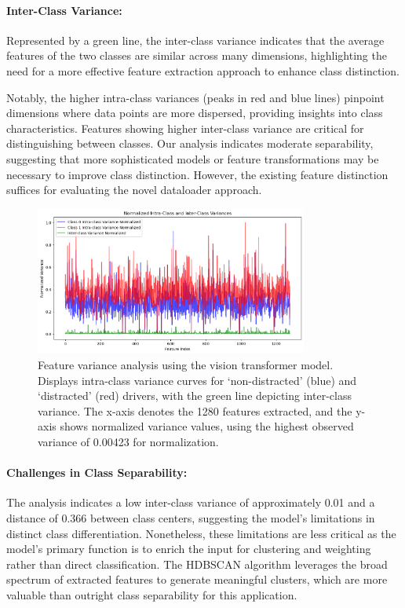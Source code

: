 \paragraph{Inter-Class Variance:} Represented by a green line, the inter-class variance indicates that the average features of the two classes are similar across many dimensions, highlighting the need for a more effective feature extraction approach to enhance class distinction.

Notably, the higher intra-class variances (peaks in red and blue lines) pinpoint dimensions where data points are more dispersed, providing insights into class characteristics. Features showing higher inter-class variance are critical for distinguishing between classes. Our analysis indicates moderate separability, suggesting that more sophisticated models or feature transformations may be necessary to improve class distinction. However, the existing feature distinction suffices for evaluating the novel dataloader approach.

\begin{figure}[htbp]
\begin{center}
\includegraphics[width=0.8\textwidth]{Images_Thesis/variance_d_b/output_normalized_variance_07.png}
\end{center}
\caption[Feature variance analysis using the vision transformer model.]{Feature variance analysis using the vision transformer model. Displays intra-class variance curves for `non-distracted' (blue) and `distracted' (red) drivers, with the green line depicting inter-class variance. The x-axis denotes the 1280 features extracted, and the y-axis shows normalized variance values, using the highest observed variance of 0.00423 for normalization.}
\label{fig:variance_analysis_image}
\end{figure}

\paragraph{Challenges in Class Separability:}
The analysis indicates a low inter-class variance of approximately 0.01 and a distance of 0.366 between class centers, suggesting the model's limitations in distinct class differentiation. Nonetheless, these limitations are less critical as the model's primary function is to enrich the input for clustering and weighting rather than direct classification. The HDBSCAN algorithm leverages the broad spectrum of extracted features to generate meaningful clusters, which are more valuable than outright class separability for this application.

